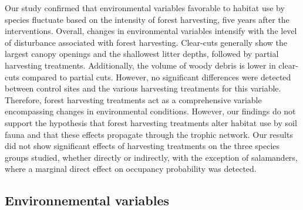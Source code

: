 Our study confirmed that environmental variables favorable to habitat use by species fluctuate based on the intensity of forest harvesting, five years after the interventions.  
Overall, changes in environmental variables intensify with the level of disturbance associated with forest harvesting. 
Clear-cuts generally show the largest canopy openings and the shallowest litter depths, followed by partial harvesting treatments. 
Additionally, the volume of woody debris is lower in clear-cuts compared to partial cuts.  
However, no significant differences were detected between control sites and the various harvesting treatments for this variable.
Therefore, forest harvesting treatments act as a comprehensive variable encompassing changes in environmental conditions.  
However, our findings do not support the hypothesis that forest harvesting treatments alter habitat use by soil fauna and that these effects propagate through the trophic network.  
Our results did not show significant effects of harvesting treatments on the three species groups studied, whether directly or indirectly,  
with the exception of salamanders, where a marginal direct effect on occupancy probability was detected.

\subsection*{Environnemental variables}
\label{disc:env_var}


